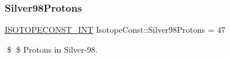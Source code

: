 \subsubsection{\texorpdfstring{Silver98\+Protons}{Silver98Protons}}
{\footnotesize\ttfamily \mbox{\hyperlink{group___isotope_const-_macros_ga5f18360b3e99483a35c32d789e62621c}{I\+S\+O\+T\+O\+P\+E\+C\+O\+N\+S\+T\+\_\+\+I\+NT}} Isotope\+Const\+::\+Silver98\+Protons = 47}

\$ \$ Protons in Silver-\/98. 